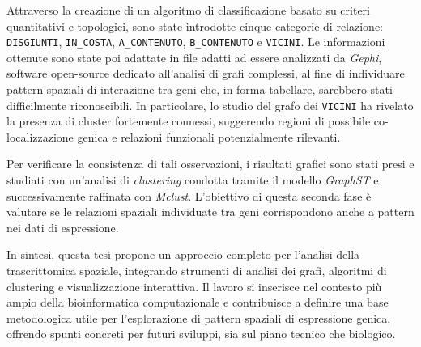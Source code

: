 \medskip
Attraverso la creazione di un algoritmo di classificazione basato su criteri quantitativi e topologici, sono state introdotte cinque categorie di relazione:
\texttt{DISGIUNTI}, \texttt{IN\_COSTA}, \texttt{A\_CONTENUTO}, \texttt{B\_CONTENUTO} e \texttt{VICINI}.  
Le informazioni ottenute sono state poi adattate in file adatti ad essere analizzati da \textit{Gephi}, software
open-source dedicato all'analisi di grafi complessi, al fine di individuare pattern spaziali di interazione tra geni che, in forma tabellare,
sarebbero stati difficilmente riconoscibili.  
In particolare, lo studio del grafo dei \texttt{VICINI} ha rivelato la presenza di cluster fortemente connessi, suggerendo
regioni di possibile co-localizzazione genica e relazioni funzionali potenzialmente rilevanti.

\medskip
Per verificare la consistenza di tali osservazioni, i risultati grafici sono stati presi e studiati con un'analisi di
\textit{clustering} condotta tramite il modello \textit{GraphST} e successivamente raffinata con \textit{Mclust}.  
L'obiettivo di questa seconda fase è valutare se le relazioni spaziali individuate tra geni corrispondono anche a pattern nei dati di espressione.  


\medskip
In sintesi, questa tesi propone un approccio completo per l'analisi della trascrittomica spaziale,
integrando strumenti di analisi dei grafi, algoritmi di clustering e visualizzazione interattiva.  
Il lavoro si inserisce nel contesto più ampio della bioinformatica computazionale e contribuisce a definire una base
metodologica utile per l'esplorazione di pattern spaziali di espressione genica, offrendo spunti concreti per futuri
sviluppi, sia sul piano tecnico che biologico.
